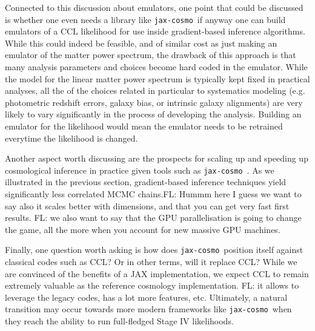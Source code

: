 \documentclass[twocolumn,twocolappendix,nofootinbib,iop]{openjournal}
\newcommand{\FrL}[1]{{\color{cyan}FL: #1}}
\newcommand{\jaxcosmo}{\texttt{jax-cosmo}}
\begin{document}
\bigskip

Connected to this discussion about emulators, one point that could be discussed is whether one even needs a library like \jaxcosmo\ if anyway one can build emulators of a CCL likelihood for use inside gradient-based inference algorithms. While this could indeed be feasible, and of similar cost as just making an emulator of the matter power spectrum, the drawback of this approach is that many analysis parameters and choices become hard coded in the emulator. While the model for the linear matter power spectrum is typically kept fixed in practical analyses, all the of the choices related in particular to systematics modeling (e.g. photometric redshift errors, galaxy bias, or intrinsic galaxy alignments) are very likely to vary significantly in the process of developing the analysis. Building an emulator for the likelihood would mean the emulator needs to be retrained everytime the likelihood is changed.

\bigskip

Another aspect worth discussing are the prospects for scaling up and speeding up cosmological inference in practice given tools such as \jaxcosmo\ . As we illustrated in the previous section, gradient-based inference techniques yield significantly less correlated MCMC chains.\FrL{Hummm here I guess we want to say also it scales better with dimensions, and that you can get very fast first results.} \FrL{we also want to say that the GPU parallelisation is going to change the game, all the more when you account for new massive GPU machines.}


\bigskip

Finally, one question worth asking is how does \jaxcosmo\ position itself against classical codes such as CCL? Or in other terms, will it replace CCL? While we are convinced of the benefits of a JAX implementation, we expect CCL to remain extremely valuable as the reference cosmology implementation. \FrL{it allows to leverage the legacy codes, has a lot more features, etc.} Ultimately, a natural transition may occur towards more modern frameworks like \jaxcosmo\ when they reach the ability to run full-fledged Stage IV likelihoods.
\end{document}
